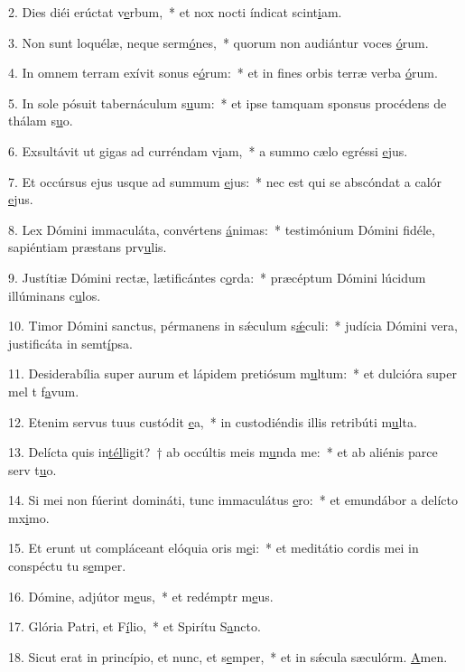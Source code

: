 2. Dies diéi erúctat v\uline{e}rbum,~* et nox nocti índicat scint\uline{i}am.\par 
3. Non sunt loquélæ, neque serm\uline{ó}nes,~* quorum non audiántur voces \uline{ó}rum.\par 
4. In omnem terram exívit sonus e\uline{ó}rum:~* et in fines orbis terræ verba \uline{ó}rum.\par 
5. In sole pósuit tabernáculum s\uline{u}um:~* et ipse tamquam sponsus procédens de thálam s\uline{u}o.\par 
6. Exsultávit ut gigas ad curréndam v\uline{i}am,~* a summo cælo egréssi \uline{e}jus.\par 
7. Et occúrsus ejus usque ad summum \uline{e}jus:~* nec est qui se abscóndat a calór \uline{e}jus.\par 
8. Lex Dómini immaculáta, convértens \uline{á}nimas:~* testimónium Dómini fidéle, sapiéntiam præstans prv\uline{u}lis.\par 
9. Justítiæ Dómini rectæ, lætificántes c\uline{o}rda:~* præcéptum Dómini lúcidum illúminans c\uline{u}los.\par 
10. Timor Dómini sanctus, pérmanens in sǽculum s\uline{ǽ}culi:~* judícia Dómini vera, justificáta in semt\uline{í}psa.\par 
11. Desiderabília super aurum et lápidem pretiósum m\uline{u}ltum:~* et dulcióra super mel t f\uline{a}vum.\par 
12. Etenim servus tuus custódit \uline{e}a,~* in custodiéndis illis retribúti m\uline{u}lta.\par 
13. Delícta quis in\uline{tél}ligit?~† ab occúltis meis m\uline{u}nda me:~* et ab aliénis parce serv t\uline{u}o.\par 
14. Si mei non fúerint domináti, tunc immaculátus \uline{e}ro:~* et emundábor a delícto mx\uline{i}mo.\par 
15. Et erunt ut compláceant elóquia oris m\uline{e}i:~* et meditátio cordis mei in conspéctu tu s\uline{e}mper.\par 
16. Dómine, adjútor m\uline{e}us,~* et redémptr m\uline{e}us.\par 
17. Glória Patri, et F\uline{í}lio,~* et Spirítu S\uline{a}ncto.\par 
18. Sicut erat in princípio, et nunc, et s\uline{e}mper,~* et in sǽcula sæculórm. \uline{A}men.\par 
